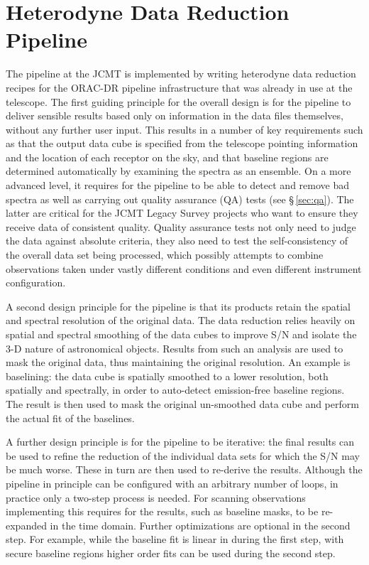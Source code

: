 \documentclass[final,authoryear,5p,times,twocolumn]{elsarticle}
\begin{document}
\section{Heterodyne Data Reduction Pipeline}

The pipeline at the JCMT is implemented by writing heterodyne data
reduction recipes for the ORAC-DR pipeline infrastructure
\citep{2011tfa..confE..42J,2008AN....329..295C} that was already in
use at the telescope. The first guiding principle for the overall
design is for the pipeline to deliver sensible results based only on
information in the data files themselves, without any further user
input. This results in a number of key requirements such as that the
output data cube is specified from the telescope pointing information
and the location of each receptor on the sky, and that baseline
regions are determined automatically by examining the spectra as an
ensemble. On a more advanced level, it requires for the pipeline to be
able to detect and remove bad spectra as well as carrying out quality
assurance (QA) tests (see \S\,\ref{sec:qa}). The latter are critical
for the JCMT Legacy Survey projects
\citep{2007PASP..119..855W,2009ApJ...693.1736W,2007PASP..119..102P}
who want to ensure they receive data of consistent quality.  Quality
assurance tests not only need to judge the data against absolute
criteria, they also need to test the self-consistency of the overall
data set being processed, which possibly attempts to combine
observations taken under vastly different conditions and even
different instrument configuration.

A second design principle for the pipeline is that its products
retain the spatial and spectral resolution of the original data.  The
data reduction relies heavily on spatial and spectral smoothing of the
data cubes to improve S/N and isolate the 3-D nature of astronomical
objects. Results from such an analysis are used to mask the original
data, thus maintaining the original resolution. An example is
baselining: the data cube is spatially smoothed to a lower resolution,
both spatially and spectrally, in order to auto-detect emission-free
baseline regions. The result is then used to mask the original
un-smoothed data cube and perform the actual fit of the baselines.

A further design principle is for the pipeline to be iterative: the
final results can be used to refine the reduction of the individual data
sets for which the S/N may be much worse. These in turn are then used
to re-derive the results. Although the pipeline in principle can be
configured with an arbitrary number of loops, in practice only a
two-step process is needed. For scanning observations implementing
this requires for the results, such as baseline masks, to be
re-expanded in the time domain. Further optimizations are optional in
the second step. For example, while the baseline fit is linear in
during the first step, with secure baseline regions higher order fits
can be used during the second step.
\end{document}

